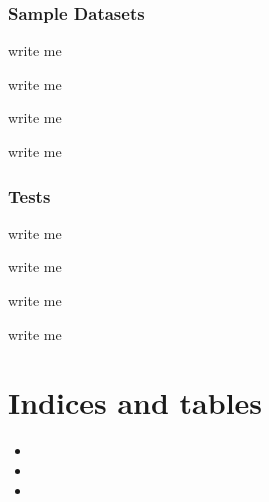 \documentclass[letterpaper,10pt,english]{sphinxmanual}
\begin{document}
\subsection{Sample Datasets}
\label{\detokenize{Development Tools:sample-datasets}}
\begin{DUlineblock}{0em}
\item[] write me
\item[] write me
\item[] write me
\item[] write me
\end{DUlineblock}


\subsection{Tests}
\label{\detokenize{Development Tools:tests}}
\begin{DUlineblock}{0em}
\item[] write me
\item[] write me
\item[] write me
\item[] write me
\end{DUlineblock}


\chapter{Indices and tables}
\label{\detokenize{index:indices-and-tables}}\begin{itemize}
\item {} 
\sphinxAtStartPar
{}

\item {} 
\sphinxAtStartPar
{}

\item {} 
\sphinxAtStartPar
{}

\end{itemize}


\renewcommand{\indexname}{Python Module Index}
\begin{sphinxtheindex}
\let\bigletter\sphinxstyleindexlettergroup
\bigletter{c}
\item\relax{}
\item\relax{}
\end{sphinxtheindex}

\renewcommand{\indexname}{Index}
\printindex
\end{document}
